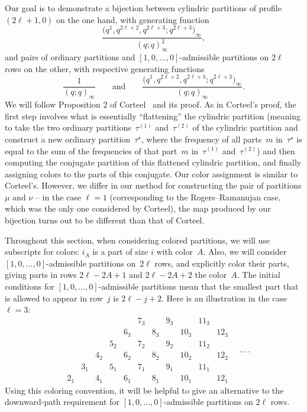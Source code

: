 \documentclass[pdftex]{sigma}
\numberwithin{equation}{section}
\theoremstyle{definition}
\begin{document}
Our goal is to demonstrate a bijection between cylindric partitions of profile $(2\ell+1,0)$ on the one hand, with generating function
\[\frac{\bigl(q^1,q^{2\ell+2},q^{2\ell+3};q^{2\ell+3}\bigr)_\infty}{(q;q)_\infty ^2},\]
and pairs of ordinary partitions and $[1,0,\dots,0]$-admissible partitions on $2\ell$ rows on the other, with respective generating functions
\[ \frac{1}{(q;q)_\infty} \qquad \text{and} \qquad \frac{\bigl(q^1,q^{2\ell+2},q^{2\ell+3};q^{2\ell+3}\bigr)_\infty}{(q;q)_\infty}.\] We will follow Proposition 2 of Corteel~\cite{Cort} and its proof. As in Corteel's proof, the first step involves what is essentially ``flattening'' the cylindric partition (meaning to take the two ordinary partitions~$\tau^{(1)}$ and~$\tau^{(2)}$ of the cylindric partition and construct a new ordinary partition~$\tau^{\star}$, where the frequency of all parts~$m$ in~$\tau^{\star}$ is equal to the sum of the frequencies of that part~$m$ in~$\tau^{(1)}$ and~$\tau^{(2)}$) and then computing the conjugate partition of this flattened cylindric partition, and finally assigning colors to the parts of this conjugate. Our color assignment is similar to Corteel's. However, we differ in our method for constructing the pair of partitions $\mu$ and $\nu$ -- in the case $\ell=1$ (corresponding to the Rogers--Ramanujan case, which was the only one considered by Corteel), the map produced by our bijection turns out to be different than that of Corteel.

Throughout this section, when considering colored partitions, we will use subscripts for colors: $i_A$ is a part of size $i$ with color~$A$. Also, we will consider $[1,0,\dots,0]$-admissible partitions on~$2\ell$ rows, and explicitly color their parts, giving parts in rows $2\ell-2A+1$ and $2\ell-2A+2$ the color~$A$. The initial conditions for $[1,0,\dots,0]$-admissible partitions mean that the smallest part that is allowed to appear in row~$j$ is $2\ell-j+2$. Here is an illustration in the case $\ell=3$:
\begin{equation*}
\begin{matrix}
 && && && 7_3 && 9_3 && 11_3 & \\
& && && 6_3 && 8_3 && 10_3 && 12_3\\
 && && 5_2 && 7_2 && 9_2 && 11_2 & \\
& && 4_2 && 6_2 && 8_2 && 10_2 && 12_2\\
 && 3_1 && 5_1 && 7_1 && 9_1 && 11_1 & \\
& 2_1 && 4_1 && 6_1 && 8_1 && 10_1 && 12_1
 \end{matrix}\quad\dots\, .
\end{equation*}
Using this coloring convention, it will be helpful to give an alternative to the downward-path requirement for $[1,0,\dots,0]$-admissible partitions on $2\ell$ rows.
\end{document}
